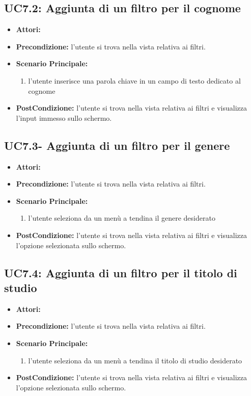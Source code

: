 \subsection{UC7.2: Aggiunta di un filtro per il cognome}
\begin{itemize}
	\item \textbf{Attori:}\loggedusr
	\item \textbf{Precondizione:} l'utente si trova nella vista relativa ai filtri.
	\item \textbf{Scenario Principale:}
	\begin{enumerate}
		\item l'utente inserisce una parola chiave in un campo di testo dedicato al cognome
	\end{enumerate}
	\item \textbf{PostCondizione:}  l'utente si trova nella vista relativa ai filtri e visualizza l'input immesso sullo schermo.
\end{itemize}

\subsection{UC7.3- Aggiunta di un filtro per il genere}
\begin{itemize}
	\item \textbf{Attori:}\loggedusr
	\item \textbf{Precondizione:} l'utente si trova nella vista relativa ai filtri.
	\item \textbf{Scenario Principale:}
	\begin{enumerate}
		\item l'utente seleziona da un menù a tendina il genere desiderato
	\end{enumerate}
	\item \textbf{PostCondizione:}  l'utente si trova nella vista relativa ai filtri e visualizza l'opzione selezionata sullo schermo.
\end{itemize}

\subsection{UC7.4: Aggiunta di un filtro per il titolo di studio}
\begin{itemize}
	\item \textbf{Attori:}\loggedusr
	\item \textbf{Precondizione:} l'utente si trova nella vista relativa ai filtri.
	\item \textbf{Scenario Principale:}
	\begin{enumerate}
		\item l'utente seleziona da un menù a tendina il titolo di studio desiderato
	\end{enumerate}
	\item \textbf{PostCondizione:}  l'utente si trova nella vista relativa ai filtri e visualizza l'opzione selezionata sullo schermo.
\end{itemize}
